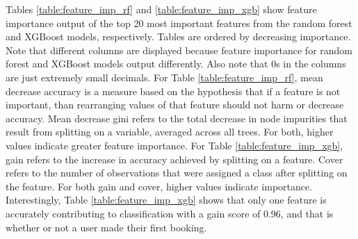 \documentclass{article}
\begin{document}
Tables \ref{table:feature_imp_rf} and \ref{table:feature_imp_xgb} show feature importance output of the top 20 most important features from the random forest and XGBoost models, respectively. Tables are ordered by decreasing importance. Note that different columns are displayed because feature importance for random forest and XGBoost models output differently. Also note that 0s in the columns are just extremely small decimals. For Table \ref{table:feature_imp_rf}, mean decrease accuracy is a measure based on the hypothesis that if a feature is not important, than rearranging values of that feature should not harm or decrease accuracy. Mean decrease gini refers to the total decrease in node impurities that result from splitting on a variable, averaged across all trees. For both, higher values indicate greater feature importance. For Table \ref{table:feature_imp_xgb}, gain refers to the increase in accuracy achieved by splitting on a feature. Cover refers to the number of observations that were assigned a class after splitting on the feature. For both gain and cover, higher values indicate importance. Interestingly, Table \ref{table:feature_imp_xgb} shows that only one feature is accurately contributing to classification with a gain score of 0.96, and that is whether or not a user made their first booking. 
\end{document}
